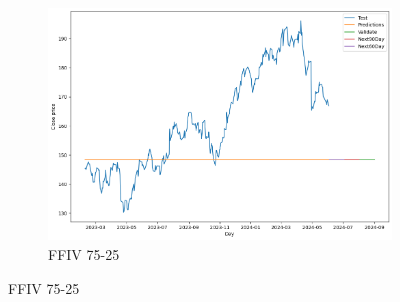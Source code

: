 \documentclass{ieeeojies}
\begin{document}
\begin{figure}[H]
\begin{subfigure}[h]{0.33\linewidth}
        \includegraphics[width=\linewidth]{ARIMA Plot/ARIMA_FFIV_75_25.png}
        \caption{FFIV 75-25}
        \label{fig:ffiv-75-25}
    \end{subfigure}
\end{figure}
\end{document}
